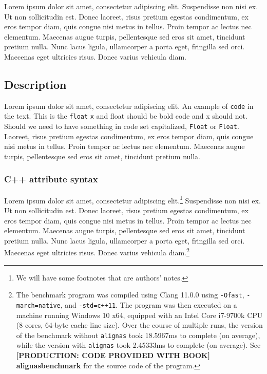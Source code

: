 

Lorem ipsum dolor sit amet, consectetur
adipiscing elit. Suspendisse non nisi ex. Ut non sollicitudin est. Donec
laoreet, risus pretium egestas condimentum, ex eros tempor diam, quis
congue nisi metus in tellus. Proin tempor ac lectus nec elementum.
Maecenas augue turpis, pellentesque sed eros sit amet, tincidunt pretium
nulla. Nunc lacus ligula, ullamcorper a porta eget, fringilla sed orci.
Maecenas eget ultricies risus. Donec varius vehicula diam.

\subsection[Description]{Description}\label{description}

Lorem ipsum dolor sit amet, consectetur
adipiscing elit. An example of \lstinline!code! in the text. This is the \lstinline!float! \lstinline!x! and float should be bold code and x should not. Should we need to have something in code set capitalized, \lstinline!Float! or \lstinline!Float!. Laoreet, risus pretium egestas condimentum, ex eros tempor diam, quis
congue nisi metus in tellus. Proin tempor ac lectus nec elementum.
Maecenas augue turpis, pellentesque sed eros sit amet, tincidunt pretium
nulla. 

\subsubsection[C++ attribute syntax]{C++ attribute syntax}\label{c++-attribute-syntax}

Lorem ipsum dolor sit amet, consectetur
adipiscing elit.{\cprotect\footnote{\authorsnote We will have
some footnotes that are authors' notes.}} Suspendisse non nisi ex. Ut non sollicitudin est. Donec
laoreet, risus pretium egestas condimentum, ex eros tempor diam, quis
congue nisi metus in tellus. Proin tempor ac lectus nec elementum.
Maecenas augue turpis, pellentesque sed eros sit amet, tincidunt pretium
nulla. Nunc lacus ligula, ullamcorper a porta eget, fringilla sed orci.
Maecenas eget ultricies risus. Donec varius vehicula diam.{\cprotect\footnote{The benchmark
program was compiled using Clang 11.0.0 using \lstinline!-Ofast!,
\lstinline!-march=native!, and \mbox{\lstinline!-std=c++11!}. The program was then
executed on a machine running Windows 10 x64, equipped with an Intel
Core i7-9700k CPU (8 cores, 64-byte cache line size). Over the
course of multiple runs, the version of the benchmark without
\lstinline!alignas! took 18.5967ms to complete (on average), while the
version with \lstinline!alignas! took 2.45333ms to complete (on average).
  See \textbf{{[PRODUCTION: CODE PROVIDED WITH BOOK] alignasbenchmark}} for the source code of the program.}}
  

